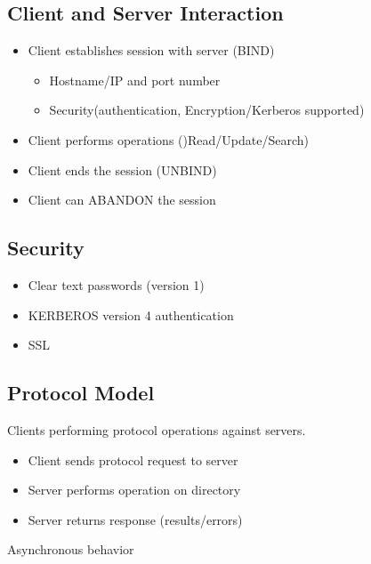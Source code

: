\documentclass{article} %
\begin{document}
\subsection{Client and Server Interaction}
	\begin{itemize}
	\item Client establishes session with server (BIND)
		\begin{itemize}
		\item Hostname/IP and port number 
		\item Security(authentication, Encryption/Kerberos supported)
		\end{itemize}
	\item Client performs operations ()Read/Update/Search)
	\item Client ends the session (UNBIND) 
	\item Client can ABANDON the session 
	\end{itemize}



\subsection{Security}
	\begin{itemize}
	\item Clear text passwords (version 1)
	\item KERBEROS version 4 authentication
	\item SSL
	\end{itemize}

\subsection{Protocol Model}
Clients performing protocol operations against servers.
	\begin{itemize}
	\item Client sends protocol request to server 
	\item Server performs operation on directory 
	\item Server returns response (results/errors)
	\end{itemize}
Asynchronous behavior 
\end{document}
